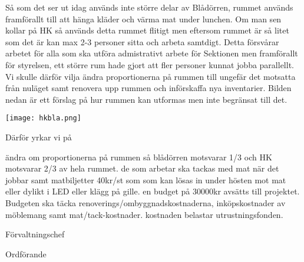 \documentclass[../_main/handlingar.tex]{subfiles}
\begin{document}

Så som det ser ut idag används inte större delar av Blådörren, rummet används framförallt till att hänga kläder och värma mat under lunchen. Om man sen kollar på HK så används detta rummet flitigt men eftersom rummet är så litet som det är kan max 2-3 personer sitta och arbeta samtdigt. Detta försvårar arbetet för alla som ska utföra admistrativt arbete för Sektionen men framförallt för styrelsen, ett större rum hade gjort att fler personer kunnat jobba parallellt. Vi skulle därför vilja ändra proportionerna på rummen till ungefär det motsatta från nuläget samt renovera upp rummen och införskaffa nya inventarier. Bilden nedan är ett förslag på hur rummen kan utformas men inte begränsat till det.

\begin{center}
    \texttt{[image: hkbla.png]}
\end{center}

Därför yrkar vi på
\begin{attsatser}
    \att ändra om proportionerna på rummen så blådörren motsvarar 1/3 och HK motsvarar 2/3 av hela rummet.
    \att de som arbetar ska tackas med mat när det jobbar samt matbiljetter 40kr/st som som kan lösas in under hösten mot mat eller dylikt i LED eller klägg på gille.
    \att en budget på 30000kr avsätts till projektet. Budgeten ska täcka renoverings/ombyggnadskostnaderna, inköpskostnader av möblemang samt mat/tack-kostnader.
    \att kostnaden belastar utrustningsfonden.
\end{attsatser}

\begin{signatures}{2}
    \ist
    \signature{Anders Nilsson}{Förvaltningschef}
    \signature{\ordf}{Ordförande}
\end{signatures}
\end{document}
